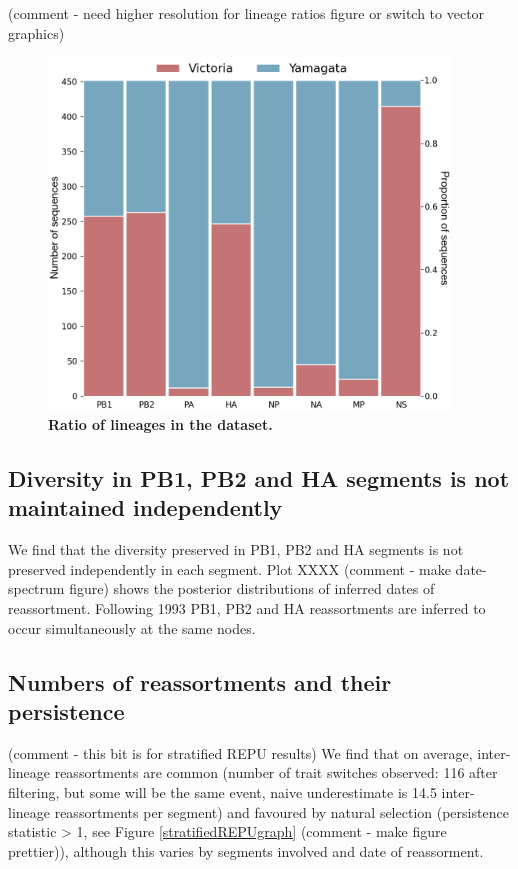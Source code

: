 \documentclass[11pt,oneside,letterpaper]{article}
\begin{document}
(comment - need higher resolution for lineage ratios figure or switch to vector graphics)
\begin{figure}[h]
	\centering		
	\includegraphics[width=0.95\textwidth]{figures/InfB_LineageRatios.png}
	\caption{\textbf{Ratio of lineages in the dataset.}}
	\label{lineageRatios}
\end{figure}

\subsection*{Diversity in PB1, PB2 and HA segments is not maintained independently}
We find that the diversity preserved in PB1, PB2 and HA segments is not preserved independently in each segment.
Plot XXXX (comment - make date-spectrum figure) shows the posterior distributions of inferred dates of reassortment.
Following 1993 PB1, PB2 and HA reassortments are inferred to occur simultaneously at the same nodes.


\subsection*{Numbers of reassortments and their persistence}

(comment - this bit is for stratified REPU results)
We find that on average, inter-lineage reassortments are common (number of trait switches observed: 116 after filtering, but some will be the same event, naive underestimate is 14.5 inter-lineage reassortments per segment) and favoured by natural selection (persistence statistic > 1, see Figure \ref{stratifiedREPUgraph} (comment - make figure prettier)), although this varies by segments involved and date of reassorment.
\end{document}
